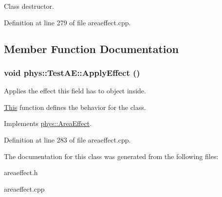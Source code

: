 Class destructor. 

Definition at line 279 of file areaeffect.cpp.



\subsection{Member Function Documentation}
\hypertarget{classphys_1_1TestAE_a191c60dbfa277e850ea392d9ab774c42}{
\subsubsection[{ApplyEffect}]{\setlength{\rightskip}{0pt plus 5cm}void phys::TestAE::ApplyEffect ()}}
\label{d1/dca/classphys_1_1TestAE_a191c60dbfa277e850ea392d9ab774c42}


Applies the effect this field has to object inside. 

\hyperlink{structThis}{This} function defines the behavior for the class. 

Implements \hyperlink{classphys_1_1AreaEffect_a3b285ecfcf9c9200662d510e48dd222a}{phys::AreaEffect}.



Definition at line 283 of file areaeffect.cpp.



The documentation for this class was generated from the following files:\begin{DoxyCompactItemize}
\item 
areaeffect.h\item 
areaeffect.cpp\end{DoxyCompactItemize}
